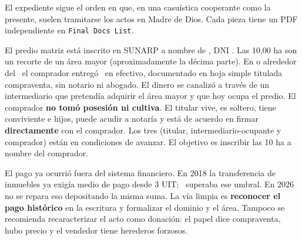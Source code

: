 \documentclass[12pt,a4paper]{article}
\begin{document}


\noindent El expediente sigue el orden en que, en una casuística cooperante como la presente, suelen tramitarse los actos en Madre de Dios. Cada pieza tiene un PDF independiente en \texttt{Final Docs List}.

El predio matriz está inscrito en SUNARP a nombre de \VendedorNombreCompleto, DNI \VendedorDNI. Las 10,00 ha son un recorte de un área mayor (aproximadamente la décima parte). En o alrededor del \FechaPago\ el comprador entregó \MontoPago\ en efectivo, documentado en hoja simple titulada compraventa, sin notario ni abogado. El dinero se canalizó a través de un intermediario que pretendía adquirir el área mayor y que hoy ocupa el predio. El comprador \textbf{no tomó posesión ni cultiva}. El titular vive, es soltero, tiene conviviente e hijos, puede acudir a notaría y está de acuerdo en firmar \textbf{directamente} con el comprador. Los tres (titular, intermediario-ocupante y comprador) están en condiciones de avanzar. El objetivo es inscribir las 10 ha a nombre del comprador.

El pago ya ocurrió fuera del sistema financiero. En 2018 la transferencia de inmuebles ya exigía medio de pago desde 3 UIT; \MontoPago\ superaba ese umbral. En 2026 no se repara eso depositando la misma suma. La vía limpia es \textbf{reconocer el pago histórico} en la escritura y formalizar el dominio y el área. Tampoco se recomienda recaracterizar el acto como donación: el papel dice compraventa, hubo precio y el vendedor tiene herederos forzosos.
\end{document}
